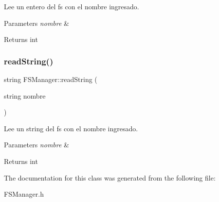 Lee un entero del fs con el nombre ingresado. 


\begin{DoxyParams}{Parameters}
{\em nombre} & \\
\hline
\end{DoxyParams}
\begin{DoxyReturn}{Returns}
int 
\end{DoxyReturn}
\mbox{\label{classFSManager_ac8de8da2e2ebf395340b46b353cec02e}} 
\subsubsection{\texorpdfstring{read\+String()}{readString()}}
{\footnotesize\ttfamily string F\+S\+Manager\+::read\+String (\begin{DoxyParamCaption}\item[{string}]{nombre }\end{DoxyParamCaption})\hspace{0.3cm}{\ttfamily [inline]}}



Lee un string del fs con el nombre ingresado. 


\begin{DoxyParams}{Parameters}
{\em nombre} & \\
\hline
\end{DoxyParams}
\begin{DoxyReturn}{Returns}
int 
\end{DoxyReturn}


The documentation for this class was generated from the following file\+:\begin{DoxyCompactItemize}
\item 
F\+S\+Manager.\+h\end{DoxyCompactItemize}
